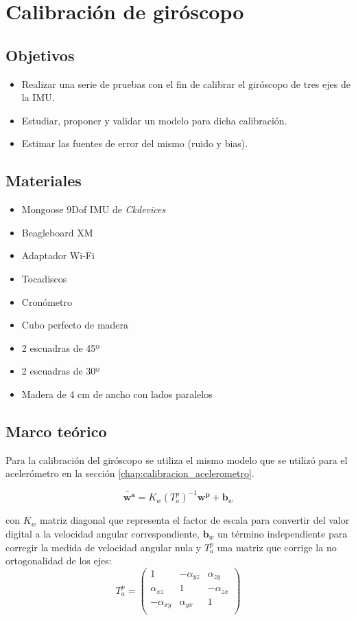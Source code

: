 \documentclass[main]{subfiles}
\begin{document}
\chapter{Calibración de giróscopo}

\section{Objetivos}

\begin{itemize}
	\item Realizar una serie de pruebas con el fin de calibrar el giróscopo de tres ejes de la IMU.
	\item Estudiar, proponer y validar un modelo para dicha calibración.
	\item Estimar las fuentes de error del mismo (ruido y bias).
\end{itemize}

\section{Materiales}
\begin{itemize}
\item Mongoose 9Dof IMU de \emph{Ckdevices}
\item Beagleboard XM
\item Adaptador Wi-Fi 
\item Tocadiscos
\item Cronómetro
\item Cubo perfecto de madera
\item 2 escuadras de 45º
\item 2 escuadras de 30º
\item Madera de 4 cm de ancho con lados paralelos
\end{itemize}

\section{Marco teórico}
Para la calibración del giróscopo se utiliza el mismo modelo que se utilizó para el acelerómetro en la sección \ref{chap:calibracion_acelerometro}.

\begin{equation}
\tilde{\mathbf{w^a}}=K_w(T_a^p)^{-1}\mathbf{w^p}+\mathbf{b}_w
\label{ec:modelo_gyro}
\end{equation}

con $K_w$ matriz diagonal que representa el factor de escala para convertir del valor digital a la velocidad angular correspondiente, $\mathbf{b}_w$ un término independiente para corregir la medida de velocidad angular nula y $T^p_a$ una matriz que corrige la no ortogonalidad de los ejes:
$$T^p_a=\left( 
\begin{matrix}
1 &-\alpha_{yz} &\alpha_{zy}\\
\alpha_{xz} &1& -\alpha_{zx} \\
-\alpha_{xy} &\alpha_{yx} &1\\
\end{matrix} 
\right)$$
\end{document}
